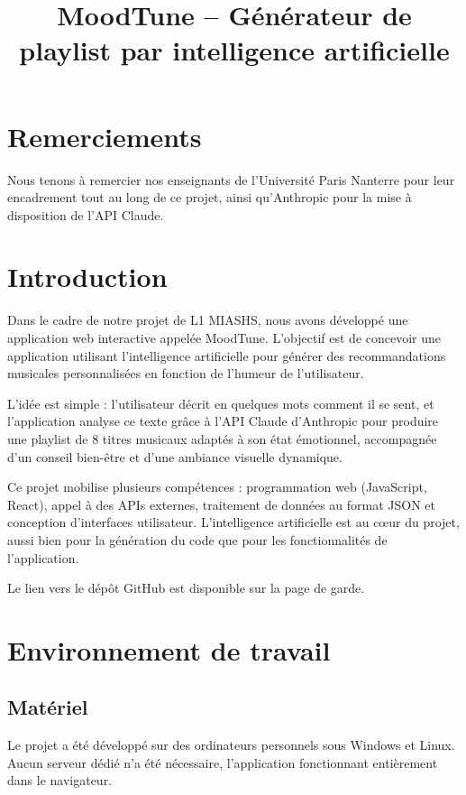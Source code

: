 \documentclass[a4paper, 12pt, twoside]{article}
\title{MoodTune -- Générateur de playlist par intelligence artificielle}
\begin{document}
\pagedegarde

\section*{Remerciements}

Nous tenons à remercier nos enseignants de l'Université Paris Nanterre pour leur encadrement tout au long de ce projet, ainsi qu'Anthropic pour la mise à disposition de l'API Claude.

\newpage

\tableofcontents
\newpage

\section{Introduction}

Dans le cadre de notre projet de L1 MIASHS, nous avons développé une application web interactive appelée MoodTune. L'objectif est de concevoir une application utilisant l'intelligence artificielle pour générer des recommandations musicales personnalisées en fonction de l'humeur de l'utilisateur.

L'idée est simple : l'utilisateur décrit en quelques mots comment il se sent, et l'application analyse ce texte grâce à l'API Claude d'Anthropic pour produire une playlist de 8 titres musicaux adaptés à son état émotionnel, accompagnée d'un conseil bien-être et d'une ambiance visuelle dynamique.

Ce projet mobilise plusieurs compétences : programmation web (JavaScript, React), appel à des APIs externes, traitement de données au format JSON et conception d'interfaces utilisateur. L'intelligence artificielle est au cœur du projet, aussi bien pour la génération du code que pour les fonctionnalités de l'application.

Le lien vers le dépôt GitHub est disponible sur la page de garde.

\section{Environnement de travail}

\subsection{Matériel}

Le projet a été développé sur des ordinateurs personnels sous Windows et Linux.
Aucun serveur dédié n'a été nécessaire, l'application fonctionnant entièrement dans le navigateur.
\end{document}
